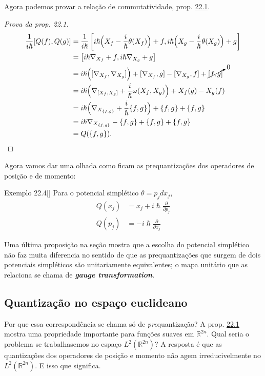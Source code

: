 Agora podemos provar a relação de commutatividade, prop. \hyperref[prop:22.1]{22.1}.

\begin{proof}[Prova da prop. 22.1]\leavevmode
\begin{align*}
	\frac{1}{i\hslash}[Q(f),Q(g)]&=\frac{1}{i\hslash}\left[  i\hslash \Big(X_f-\frac{i}{\hslash}\theta(X_f)\Big)+f,i\hslash \Big(X_g-\frac{i}{\hslash}\theta(X_g)\Big)+g\right]\\
&=\left[i\hslash \nabla_{X_f}+f,i\hslash\nabla_{X_g}+g \right] \\
&=i\hslash\Big([\nabla_{X_f},\nabla_{X_g}]\Big)+[\nabla_{X_f},g]-[\nabla_{X_g},f]+\cancelto{0}{[f,g]}\\
&=i\hslash\Big(\nabla_{[X_f,X_g]}+\frac{i}{\hslash}\omega(X_f,X_g)\Big)+X_f(g)-X_g(f)\\
&=i\hslash\Big(\nabla_{X_{\{f,g\}}}+\frac{i}{\hslash}\{f,g\}\Big)+\{f,g\}+\{f,g\}\\
&=i\hslash \nabla_{X_{\{f,g\}}}-\{f,g\}+\{f,g\}+\{f,g\}\\
&=Q(\{f,g\}).
\end{align*}
\end{proof}

Agora vamos dar uma olhada como ficam as prequantizações dos operadores de posição e de momento:

\begin{thing4}{Exemplo 22.4}[\cite{hallq}]\leavevmode
	Para o potencial simplético $\theta=p_jdx_j$,
	\begin{align*}
	Q(x_j)&=x_j+i\hslash\frac{\partial }{\partial p_j}\\
	Q(p_j)&=-i\hslash\frac{\partial }{\partial x_j}
	\end{align*}
\end{thing4}

Uma última proposição na seção mostra que a escolha do potencial simplético não faz muita diferencia no sentido de que as prequantizações que surgem de dois potenciais simpléticos são unitariamente equivalentes; o mapa unitário que as relaciona se chama de \textit{\textbf{gauge transformation}}.

\subsection{Quantização no espaço euclideano}

Por que essa correspondência se chama só de \textit{pre}quantização? A prop. \hyperref[prop:22.1]{22.1} mostra uma propriedade importante para funções suaves em $\mathbb{R}^{2n}$. Qual seria o problema se trabalhasemos no espaço $L^2(\mathbb{R}^{2n})$? A resposta é que as quantizações dos operadores de posição e momento não  agem irreducivelmente no $L^2(\mathbb{R}^{2n})$. E isso que significa.

